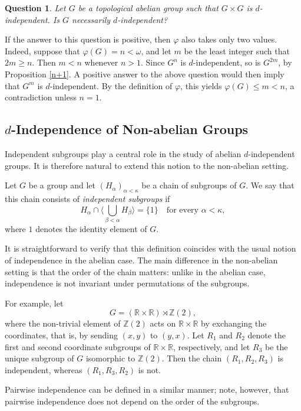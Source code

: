 \documentclass[12pt]{amsart}
\newtheorem{question}[theorem]{Question}
\theoremstyle{definition}
\theoremstyle{remark}
\newcommand{\hull}[1]{\langle #1 \rangle}
\begin{document}
\begin{question}
Let $G$ be a topological abelian group such that $G\times G$ is
$d$-independent. Is $G$ necessarily $d$-independent?
\end{question}

If the answer to this question is positive, then $\varphi$ also takes only two
values.
Indeed, suppose that $\varphi(G)=n<\omega$, and let $m$ be the least integer
such that $2m\geq n$.
Then $m<n$ whenever $n>1$.
Since $G^n$ is $d$-independent, so is $G^{2m}$, by Proposition \ref{n+1}.
A positive answer to the above question would then imply that $G^m$ is
$d$-independent.
By the definition of $\varphi$, this yields $\varphi(G)\leq m<n$, a
contradiction unless $n=1$.


\subsection{$d$-Independence of Non-abelian Groups}

Independent subgroups play a central role in the study of abelian
$d$-independent groups. It is therefore natural to extend this notion
to the non-abelian setting.

Let $G$ be a group and let $(H_\alpha)_{\alpha<\kappa}$ be a chain of
subgroups of $G$. We say that this chain consists of
\emph{independent subgroups} if
\[
H_\alpha \cap \hull{\bigcup_{\beta<\alpha} H_\beta}=\{1\}
\quad \text{for every } \alpha<\kappa,
\]
where $1$ denotes the identity element of $G$.

It is straightforward to verify that this definition coincides with
the usual notion of independence in the abelian case. The main
difference in the non-abelian setting is that the order of the chain
matters: unlike in the abelian case, independence is not invariant
under permutations of the subgroups.

For example, let
\[
G=(\mathbb{R}\times \mathbb{R})\rtimes \mathbb{Z}(2),
\]
where the non-trivial element of $\mathbb{Z}(2)$ acts on
$\mathbb{R}\times \mathbb{R}$ by exchanging the coordinates, that is,
by sending $(x,y)$ to $(y,x)$.
Let $R_1$ and $R_2$ denote the first and second coordinate subgroups of
$\mathbb{R}\times \mathbb{R}$, respectively, and let $R_3$ be the unique
subgroup of $G$ isomorphic to $\mathbb{Z}(2)$.
Then the chain $(R_1,R_2,R_3)$ is independent, whereas
$(R_1,R_3,R_2)$ is not.

Pairwise independence can be defined in a similar manner; note,
however, that pairwise independence does not depend on the order of
the subgroups.
\end{document}
